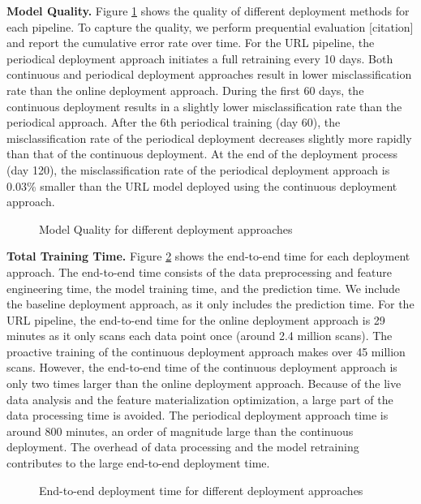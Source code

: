 \textbf{Model Quality. }
Figure \ref{deployment-quality-figure} shows the quality of different deployment methods for each pipeline. 
To capture the quality, we perform prequential evaluation [citation] and report the cumulative error rate over time.
For the URL pipeline, the periodical deployment approach initiates a full retraining every 10 days.
Both continuous and periodical deployment approaches result in lower misclassification rate than the online deployment approach.
During the first 60 days, the continuous deployment results in a slightly lower misclassification rate than the periodical approach.
After the 6th periodical training (day 60), the misclassification rate of the periodical deployment decreases slightly more rapidly than that of the continuous deployment. 
At the end of the deployment process (day 120), the misclassification rate of the periodical deployment approach is 0.03\% smaller than the URL model deployed using the continuous deployment approach.
\begin{figure}[h!]
\centering
\resizebox{\columnwidth}{!}{}
\caption{Model Quality for different deployment approaches}
\label{deployment-quality-figure}
\end{figure}

\textbf{Total Training Time. }
Figure \ref{deployment-time-figure} shows the end-to-end  time for each deployment approach.
The end-to-end time consists of the data preprocessing and feature engineering time, the model training time, and the prediction time. 
We include the baseline deployment approach, as it only includes the prediction time.
For the URL pipeline, the end-to-end time for the online deployment approach is 29 minutes as it only scans each data point once (around 2.4 million scans).  
The proactive training of the continuous deployment approach makes over 45 million scans.
However, the end-to-end time of the continuous deployment approach is only two times larger than the online deployment approach. 
Because of the live data analysis and the feature materialization optimization, a large part of the data processing time is avoided.
The periodical deployment approach time is around 800 minutes, an order of magnitude large than the continuous deployment. 
The overhead of data processing and the model retraining contributes to the large end-to-end deployment time.

\begin{figure}[h!]
\centering
\resizebox{\columnwidth}{!}{}
\caption{End-to-end deployment time for different deployment approaches}
\label{deployment-time-figure}
\end{figure}

